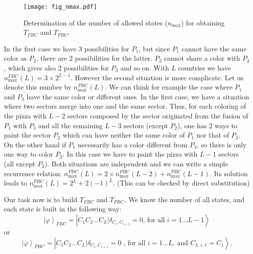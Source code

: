 \documentclass[3p, 10pt, onecolumn]{elsarticle}
\begin{document}
\begin{figure}[tbp]
\begin{center}
\texttt{[image: fig\_nmax.pdf]}
\end{center}
\caption{Determination of the number of allowed states ($n_{\max
} $) for obtaining $T_{FBC}$ and $T_{PBC}$. }
\label{Fig_nmax}
\end{figure}

In the first case we have 3 possibilities for $P_{1}$, but since $P_{1}$
cannot have the same color as $P_{2}$, there are 2 possibilities for the
latter. $P_{2}$ cannot share a color with $P_{3}$, which gives also 2
possibilities for $P_{3}$ and so on. With $L$ countries we have $n_{\max
}^{FBC}(L)=3\times 2^{L-1}$. However the second situation is more
complicate. Let us denote this number by $n_{\max }^{PBC}(L)$. We can think
for example the case where $P_{1}$ and $P_{3}$ have the same color or
different ones. In the first case, we have a situation where two sectors
merge into one and the same sector. Thus, for each coloring of the
pizza with $L-2$ sectors composed by the sector originated from the
fusion of $P_{1}$ with $P_{3}$ and all the remaining $L-3$ sectors (except $%
P_{2}$), one has 2 ways to paint the sector $P_{2}$ which can have neither
the same color of $P_{1}$ nor that of $P_{3}$. On the other hand if $P_{1}$
necessarily has a color different from $P_{3}$, so there is only one way to
color $P_{2}$. In this case we have to paint the pizza with $L-1$
sectors (all except $P_{2}$). Both situations are independent and we can
write a simple recurrence relation: $n_{\max }^{PBC}(L)=2\times n_{\max
}^{PBC}(L-2)+n_{\max }^{PBC}(L-1)$. Its solution leads to $n_{\max
}^{PBC}(L)=2^{L}+2(-1)^{L}$. (This can be checked by direct substitution)

Our task now is to build $T_{FBC}$ and $T_{PBC}$. We know the number of all
states, and each state is built in the following way:%
\begin{equation}
\left\vert \varphi \right\rangle _{FBC}=\left\vert C_{1}C_{2}...C_{L}|\delta
_{C_{i},C_{i+1}}=0\text{, for all }i=1...L-1\right\rangle
\end{equation}%
or%
\begin{equation}
\left\vert \varphi \right\rangle _{PBC}=\left\vert C_{1}C_{2}...C_{L}|\delta
_{C_{i},C_{i+1}}=0\text{ , for all }i=1...L\text{,\ and }C_{L+1}=C_{1}\right%
\rangle .
\end{equation}
\end{document}
